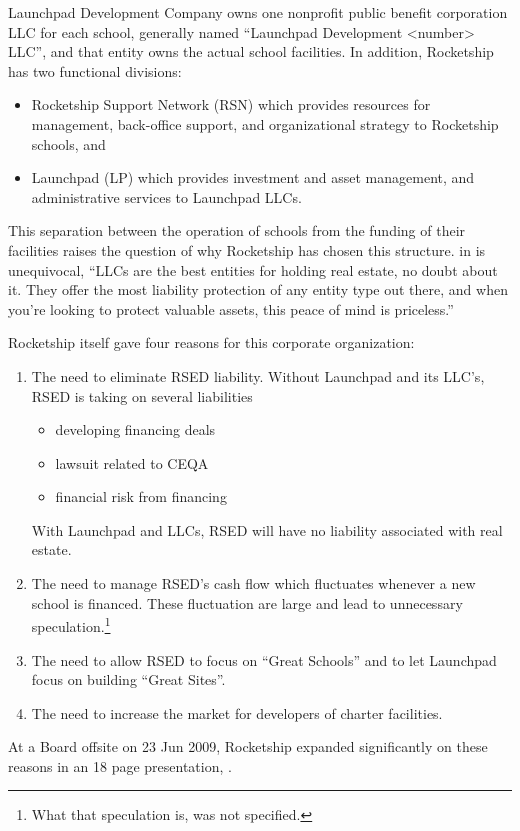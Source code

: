 Launchpad Development Company owns one nonprofit public benefit corporation LLC for each school, generally named ``Launchpad Development <number> LLC'', and that entity owns the actual school facilities. In addition, Rocketship has two functional divisions:
\begin{itemize}
  \item Rocketship Support Network (RSN) which provides resources for management, back-office support, and organizational strategy to Rocketship schools, and
  \item Launchpad (LP) which provides investment and asset management, and administrative services to Launchpad LLCs.
\end{itemize}

This separation between the operation of schools from the funding of their facilities raises the question of why Rocketship has chosen this structure.  in  is unequivocal, ``LLCs are the best entities for holding real estate, no doubt about it. They offer the most liability protection of any entity type out there, and when you're looking to protect valuable assets, this peace of mind is priceless.'' \parencite[292]{Reuting2023}

Rocketship itself gave four reasons for this corporate organization:
\begin{enumerate}
  \item The need to eliminate RSED liability. Without Launchpad and its LLC's, RSED is taking on several liabilities
  \begin{itemize}
    \item developing financing deals
    \item lawsuit related to CEQA
    \item financial risk from financing
  \end{itemize}
  With Launchpad and LLCs, RSED will have no liability associated with real estate.
  \item The need to manage RSED's cash flow which fluctuates whenever a new school is financed. These fluctuation are large and lead to unnecessary speculation.\footnote{What that speculation is, was not specified.}
  \item The need to allow RSED to focus on ``Great Schools'' and to let Launchpad focus on building ``Great Sites''.
  \item The need to increase the market for developers of charter facilities.
\end{enumerate}
At a Board offsite on 23 Jun 2009, Rocketship expanded significantly on these reasons in an 18 page presentation, \textcite{RSED2009}.


